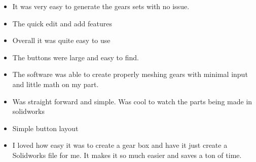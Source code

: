 \begin{itemize}
    \item It was very easy to generate the gears sets with no issue.
    \item The quick edit and add features
    \item Overall it was quite easy to use
    \item The buttons were large and easy to find.
    \item The software was able to create properly meshing gears with minimal input and little math on my part.
    \item Was straight forward and simple. Was cool to watch the parts being made in solidworks 
    \item Simple button layout
    \item I loved how easy it was to create a gear box and have it just create a Solidworks file for me. It makes it so much easier and saves a ton of time. 
\end{itemize}

